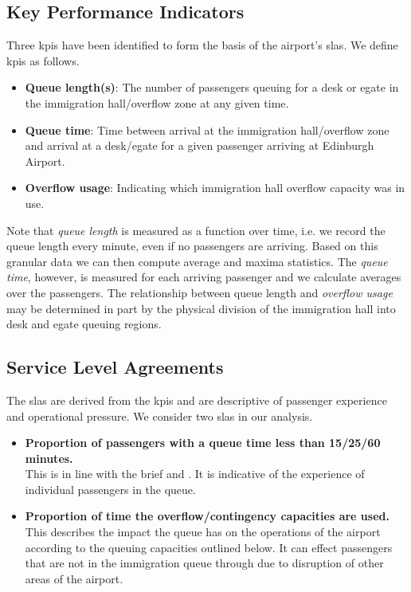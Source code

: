 \documentclass[10pt]{article}
\begin{document}
\subsection{Key Performance Indicators}

Three \glspl{kpi} have been identified to form the basis of the airport's \glspl{sla}. We define \glspl{kpi} as follows.

\begin{itemize}
    \item \textbf{Queue length(s)}: The number of passengers queuing for a desk or \gls{egate} in the immigration hall/overflow zone at any given time.
    \item \textbf{Queue time}: Time between arrival at the immigration hall/overflow zone and arrival at a desk/\gls{egate} for a given passenger arriving at Edinburgh Airport. 
    \item \textbf{Overflow usage}: Indicating which immigration hall overflow capacity was in use.
\end{itemize}

Note that \textit{queue length} is measured as a function over time, i.e. we record the queue length every minute, even if no passengers are arriving. Based on this granular data we can then compute average and maxima statistics. The \textit{queue time}, however, is measured for each arriving passenger and we calculate averages over the passengers. The relationship between queue length and \textit{overflow usage} may be determined in part by the physical division of the immigration hall into desk and \gls{egate} queuing regions.

\subsection{Service Level Agreements}
The \glspl{sla} are derived from the \glspl{kpi} and are descriptive of passenger experience and operational pressure. We consider two \glspl{sla} in our analysis.
\begin{itemize}
    \item \textbf{Proportion of passengers with a queue time less than 15/25/60 minutes.} \\
    This is in line with the brief and \cite{UK_border_2025}. It is indicative of the experience of individual passengers in the queue.
    \item \textbf{ Proportion of time the overflow/contingency capacities are used.} \\
    This describes the impact the queue has on the operations of the airport according to the queuing capacities outlined below. It can effect passengers that are not in the immigration queue through due to disruption of other areas of the airport.
\end{itemize}
\end{document}
